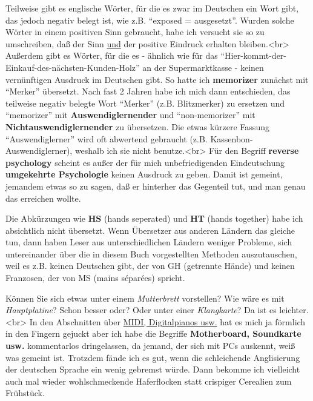 Teilweise gibt es englische Wörter, für die es zwar im Deutschen ein Wort gibt, das jedoch negativ belegt ist, wie z.B. \enquote{exposed = ausgesetzt}.
Wurden solche Wörter in einem positiven Sinn gebraucht, habe ich versucht sie so zu umschreiben, daß der Sinn \underline{und} der positive Eindruck erhalten bleiben.<br>
\label{memorizer}
Außerdem gibt es Wörter, für die es - ähnlich wie für das \enquote{Hier-kommt-der-Einkauf-des-nächsten-Kunden-Holz} an der Supermarktkasse - keinen vernünftigen Ausdruck im Deutschen gibt.
So hatte ich \textbf{memorizer} zunächst mit \enquote{Merker} übersetzt. Nach fast 2 Jahren habe ich mich dann entschieden, das teilweise negativ belegte Wort \enquote{Merker} (z.B. Blitzmerker) zu ersetzen und \enquote{memorizer} mit \textbf{Auswendiglernender} und \enquote{non-memorizer} mit \textbf{Nichtauswendiglernender} zu übersetzen. Die etwas kürzere Fassung \enquote{Auswendiglerner} wird oft abwertend gebraucht (z.B. Kassenbon-Auswendiglerner), weshalb ich sie nicht benutze.<br>
\label{reversepsychology}
Für den Begriff \textbf{reverse psychology} scheint es außer der für mich unbefriedigenden Eindeutschung \textbf{umgekehrte Psychologie} keinen Ausdruck zu geben.
Damit ist gemeint, jemandem etwas so zu sagen, daß er hinterher das Gegenteil tut, und man genau das erreichen wollte.


\label{HsHt}

Die Abkürzungen wie \textbf{HS} (hands seperated) und \textbf{HT} (hands together) habe ich absichtlich nicht übersetzt.
Wenn Übersetzer aus anderen Ländern das gleiche tun, dann haben Leser aus unterschiedlichen Ländern weniger Probleme, sich untereinander über die in diesem Buch vorgestellten Methoden auszutauschen, weil es z.B. keinen Deutschen gibt, der von GH (getrennte Hände) und keinen Franzosen, der von MS (mains séparées) spricht.


\label{Motherboard}

Können Sie sich etwas unter einem \textit{Mutterbrett} vorstellen? Wie wäre es mit \textit{Hauptplatine}?
Schon besser oder?
Oder unter einer \textit{Klangkarte}? Da ist es leichter.<br>
In den Abschnitten über \hyperref[c1iii13MIDI]{MIDI, Digitalpianos usw.} hat es mich ja förmlich in den Fingern gejuckt aber ich habe die Begriffe \textbf{Motherboard, Soundkarte usw.} kommentarlos dringelassen, da jemand, der sich mit PCs auskennt, weiß was gemeint ist.
Trotzdem fände ich es gut, wenn die schleichende Anglisierung der deutschen Sprache ein wenig gebremst würde.
Dann bekomme ich vielleicht auch mal wieder wohlschmeckende Haferflocken statt crispiger Cerealien zum Frühstück.


